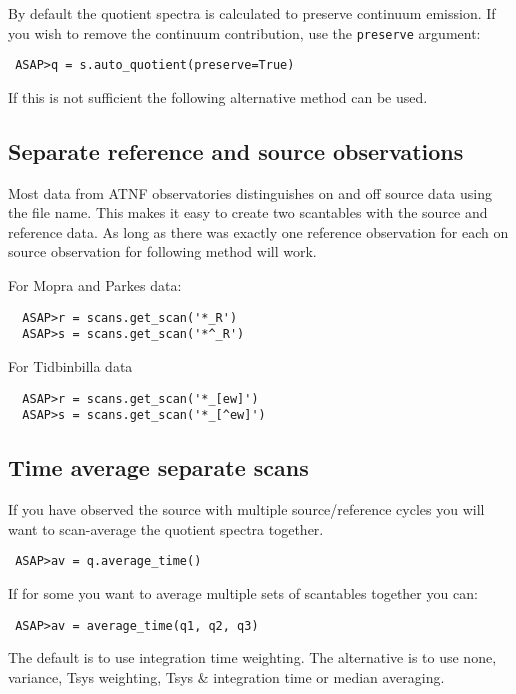 \documentclass[11pt]{article}
\newcommand{\cmd}[1]{{\tt #1}}
\begin{document}
By default the quotient spectra is calculated
to preserve continuum emission. If you wish to remove the continuum
contribution, use the \cmd{preserve} argument:

\begin{verbatim}
 ASAP>q = s.auto_quotient(preserve=True)
\end{verbatim}

If this is not sufficient the following alternative method can be used.

\subsection{Separate reference and source observations}

Most data from ATNF observatories
distinguishes on and off source data using the file name. This makes
it easy to create two scantables with the source and reference
data. As long as there was exactly one reference observation for each
on source observation for following method will work.

For Mopra and Parkes data:
\begin{verbatim}
  ASAP>r = scans.get_scan('*_R')
  ASAP>s = scans.get_scan('*^_R')
\end{verbatim}

For Tidbinbilla data
\begin{verbatim}
  ASAP>r = scans.get_scan('*_[ew]')
  ASAP>s = scans.get_scan('*_[^ew]')
\end{verbatim}

\subsection{Time average separate scans}

If you have observed the source with multiple
source/reference cycles you will want to scan-average the quotient
spectra together.

\begin{verbatim}
 ASAP>av = q.average_time()
\end{verbatim}

If for some you want to average multiple sets of scantables together
you can:

\begin{verbatim}
 ASAP>av = average_time(q1, q2, q3)
\end{verbatim}

The default is to use integration time weighting. The alternative is
to use none, variance, Tsys weighting, Tsys \& integration time or
median averaging.
\end{document}

